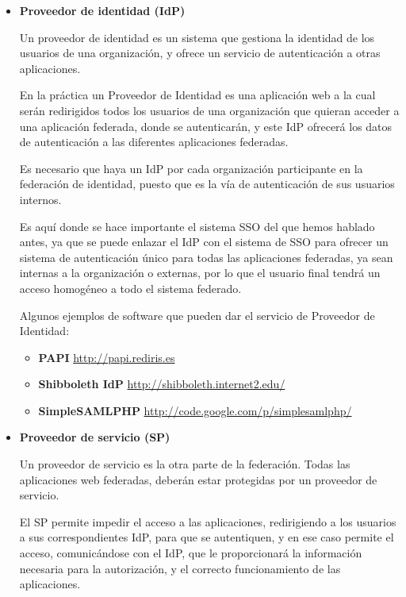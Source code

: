 \begin{itemize}
            \item \textbf{Proveedor de identidad (IdP)}

    Un proveedor de identidad es un sistema que gestiona la identidad
    de los usuarios de una organización, y ofrece un servicio de
    autenticación a otras aplicaciones.

    En la práctica un Proveedor de Identidad es una aplicación web a
    la cual serán redirigidos todos los usuarios de una organización
    que quieran acceder a una aplicación federada, donde se
    autenticarán, y este IdP ofrecerá los datos de autenticación a las
    diferentes aplicaciones federadas.

    Es necesario que haya un IdP por cada organización participante en
    la federación de identidad, puesto que es la vía de autenticación
    de sus usuarios internos.

    Es aquí donde se hace importante el sistema SSO del que hemos
    hablado antes, ya que se puede enlazar el IdP con el sistema de
    SSO para ofrecer un sistema de autenticación único para todas las
    aplicaciones federadas, ya sean internas a la organización o
    externas, por lo que el usuario final tendrá un acceso homogéneo a
    todo el sistema federado.

    Algunos ejemplos de software que pueden dar el servicio de Proveedor
    de Identidad:
    \begin{itemize}
        \item \textbf{PAPI}
        \href{http://papi.rediris.es}{http://papi.rediris.es}
        \item \textbf{Shibboleth IdP}
        \href{http://shibboleth.internet2.edu/}{http://shibboleth.internet2.edu/}
        \item \textbf{SimpleSAMLPHP}
        \href{http://code.google.com/p/simplesamlphp/}{http://code.google.com/p/simplesamlphp/}
    \end{itemize}

            \item \textbf{Proveedor de servicio (SP)}

    Un proveedor de servicio es la otra parte de la federación. Todas
    las aplicaciones web federadas, deberán estar protegidas por un
    proveedor de servicio.

    El SP permite impedir el acceso a las aplicaciones, redirigiendo a
    los usuarios a sus correspondientes IdP, para que se autentiquen,
    y en ese caso permite el acceso, comunicándose con el IdP, que le
    proporcionará la información necesaria para la autorización, y el
    correcto funcionamiento de las aplicaciones.


\end{itemize}
